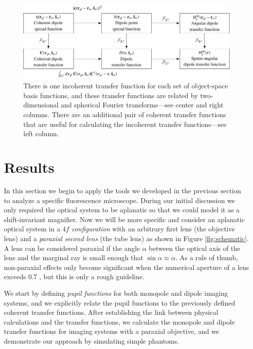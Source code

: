\documentclass[]{osa-article}
\begin{document}
\begin{figure}
  \hspace{-2em}
  \includegraphics[scale=1.0]{../figures/transfer-functions/transfer-functions.pdf}
  \caption{There is one incoherent transfer function for each set of
    object-space basis functions, and these transfer functions are related by
    two-dimensional and spherical Fourier transforms---see center and right
    columns. There are an additional pair of coherent transfer functions that
    are useful for calculating the incoherent transfer functions---see left column.}
   \label{fig:transfer-functions}
 \end{figure}
    
    
\section{Results}\label{sec:results}
In this section we begin to apply the tools we developed in the previous section
to analyze a specific fluorescence microscope. During our initial discussion we
only required the optical system to be aplanatic so that we could model it as a
shift-invariant magnifier. Now we will be more specific and consider an
aplanatic optical system in a \textit{$\mathit{4}f$ configuration} with an arbitrary
first lens (the objective lens) and a \textit{paraxial second lens} (the tube
lens) as shown in Figure \ref{fig:schematic}. A lens can be considered paraxial
if the angle $\alpha$ between the optical axis of the lens and the marginal ray
is small enough that $\sin\alpha \approx \alpha$. As a rule of thumb,
non-paraxial effects only become significant when the numerical aperture of a
lens exceeds 0.7 \cite{gu2000}, but this is only a rough guideline.

We start by defining \textit{pupil functions} for both monopole and dipole
imaging systems, and we explicitly relate the pupil functions to the previously
defined coherent transfer functions. After establishing the link between
physical calculations and the transfer functions, we calculate the monopole and
dipole transfer functions for imaging systems with a paraxial objective, and we
demonstrate our approach by simulating simple phantoms. 
\end{document}
